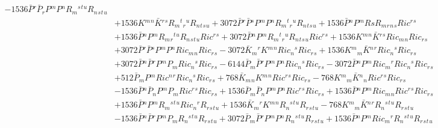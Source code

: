 \begin{align}
  - 1536 \bar{P}{}^{r} \bar{P}{}_{r} P{}^{m} P{}^{n} R{}_{m}{}^{s}{}^{t}{}^{u} R{}_{n}{}_{s}{}_{t}{}_{u}
\nonumber \\&
  + 1536 K{}^{m}{}^{n} \bar{K}{}^{r}{}^{s} R{}_{m}{}^{t}{}_{r}{}^{u} R{}_{n}{}_{t}{}_{s}{}_{u}
  + 3072 \bar{P}{}^{r} \bar{P}{}^{s} P{}^{m} P{}^{n} R{}_{m}{}^{t}{}_{r}{}^{u} R{}_{n}{}_{t}{}_{s}{}_{u}
  + 1536 \bar{P}{}^{n} P{}^{m} Rs R{}_{m}{}_{r}{}_{n}{}_{s} Ric{}^{r}{}^{s}
\nonumber \\&
  + 1536 \bar{P}{}^{n} P{}^{m} R{}_{m}{}_{r}{}^{t}{}^{u} R{}_{n}{}_{s}{}_{t}{}_{u} Ric{}^{r}{}^{s}
  + 3072 \bar{P}{}^{n} P{}^{m} R{}_{m}{}^{t}{}_{r}{}^{u} R{}_{n}{}_{t}{}_{s}{}_{u} Ric{}^{r}{}^{s}
  + 1536 K{}^{m}{}^{n} \bar{K}{}^{r}{}^{s} Ric{}_{m}{}_{n} Ric{}_{r}{}_{s}
\nonumber \\&
  + 3072 \bar{P}{}^{r} \bar{P}{}^{s} P{}^{m} P{}^{n} Ric{}_{m}{}_{n} Ric{}_{r}{}_{s}
  - 3072 \bar{K}{}_{m}{}^{r} K{}^{m}{}^{n} Ric{}_{n}{}^{s} Ric{}_{r}{}_{s}
  + 1536 K{}^{m}{}_{m} \bar{K}{}^{n}{}^{r} Ric{}_{n}{}^{s} Ric{}_{r}{}_{s}
\nonumber \\&
  + 3072 \bar{P}{}^{n} \bar{P}{}^{r} P{}^{m} P{}_{m} Ric{}_{n}{}^{s} Ric{}_{r}{}_{s}
  - 6144 \bar{P}{}_{m} \bar{P}{}^{r} P{}^{m} P{}^{n} Ric{}_{n}{}^{s} Ric{}_{r}{}_{s}
  - 3072 \bar{P}{}^{n} P{}^{m} Ric{}_{m}{}^{r} Ric{}_{n}{}^{s} Ric{}_{r}{}_{s}
\nonumber \\&
  + 512 \bar{P}{}_{m} P{}^{m} Ric{}^{n}{}^{r} Ric{}_{n}{}^{s} Ric{}_{r}{}_{s}
  + 768 \bar{K}{}_{m}{}_{n} K{}^{m}{}^{n} Ric{}^{r}{}^{s} Ric{}_{r}{}_{s}
  - 768 K{}^{m}{}_{m} \bar{K}{}^{n}{}_{n} Ric{}^{r}{}^{s} Ric{}_{r}{}_{s}
\nonumber \\&
  - 1536 \bar{P}{}^{n} \bar{P}{}_{n} P{}^{m} P{}_{m} Ric{}^{r}{}^{s} Ric{}_{r}{}_{s}
  + 1536 \bar{P}{}_{m} \bar{P}{}_{n} P{}^{m} P{}^{n} Ric{}^{r}{}^{s} Ric{}_{r}{}_{s}
  + 1536 \bar{P}{}^{n} P{}^{m} Ric{}_{m}{}_{n} Ric{}^{r}{}^{s} Ric{}_{r}{}_{s}
\nonumber \\&
  + 1536 \bar{P}{}^{n} P{}^{m} R{}_{m}{}^{s}{}^{t}{}^{u} Ric{}_{n}{}^{r} R{}_{r}{}_{s}{}_{t}{}_{u}
  + 1536 \bar{K}{}_{m}{}^{r} K{}^{m}{}^{n} R{}_{n}{}^{s}{}^{t}{}^{u} R{}_{r}{}_{s}{}_{t}{}_{u}
  - 768 K{}^{m}{}_{m} \bar{K}{}^{n}{}^{r} R{}_{n}{}^{s}{}^{t}{}^{u} R{}_{r}{}_{s}{}_{t}{}_{u}
\nonumber \\&
  - 1536 \bar{P}{}^{n} \bar{P}{}^{r} P{}^{m} P{}_{m} R{}_{n}{}^{s}{}^{t}{}^{u} R{}_{r}{}_{s}{}_{t}{}_{u}
  + 3072 \bar{P}{}_{m} \bar{P}{}^{r} P{}^{m} P{}^{n} R{}_{n}{}^{s}{}^{t}{}^{u} R{}_{r}{}_{s}{}_{t}{}_{u}
  + 1536 \bar{P}{}^{n} P{}^{m} Ric{}_{m}{}^{r} R{}_{n}{}^{s}{}^{t}{}^{u} R{}_{r}{}_{s}{}_{t}{}_{u}

\end{align}

